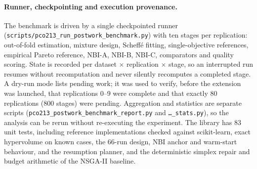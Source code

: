 \documentclass[11pt,a4paper]{article}
\begin{document}
\paragraph{Runner, checkpointing and execution provenance.}
The benchmark is driven by a single checkpointed runner
(\texttt{scripts/\allowbreak pco213\_\allowbreak run\_\allowbreak postwork\_\allowbreak benchmark.py}) with ten
stages per replication: out-of-fold estimation, mixture design, Scheff\'e fitting, single-objective references,
empirical Pareto reference, NBI-A, NBI-B, NBI-C, comparators and quality scoring. State is recorded per dataset
$\times$ replication $\times$ stage, so an interrupted run resumes without recomputation and never silently
recomputes a completed stage. A dry-run mode lists pending work; it was used to verify, before the extension was
launched, that replications 0--9 were complete and that exactly 80 replications (800 stages) were pending.
Aggregation and statistics are separate scripts
(\texttt{pco213\_\allowbreak postwork\_\allowbreak benchmark\_\allowbreak report.py} and
\texttt{\ldots\_\allowbreak stats.py}), so the analysis can be rerun without re-executing the experiment. The
library has 83 unit tests, including reference implementations checked against scikit-learn, exact hypervolume on
known cases, the 66-run design, NBI anchor and warm-start behaviour, and the resumption planner, and the deterministic simplex repair and budget arithmetic of the NSGA-II baseline.
\end{document}
